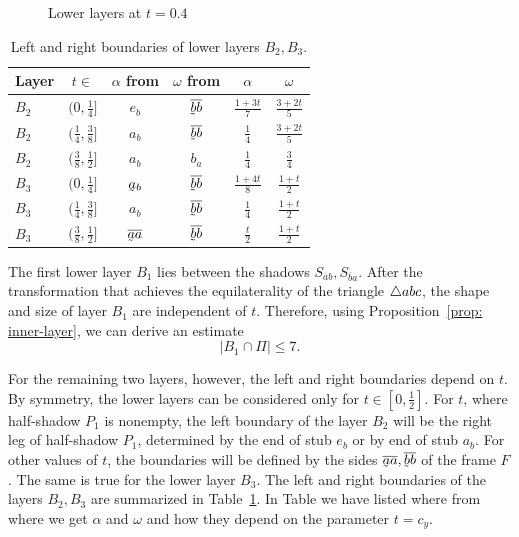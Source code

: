 \begin{figure}
\begin{center}

\end{center}
\caption{Lower layers at $t = 0.4$}
\label{fig: lower-layers}
\end{figure}

\begin{table}
\begin{center}
\begin{tabular}{lccccc}
	\toprule[1.5pt]
    Layer & $t \in $ & $\alpha$ from & $\omega$ from & $\alpha$ & $\omega$ \\
	\midrule[1.5pt]
	$B_{2}$ & $(0, \frac{1}{4}]$           & $e_{b}$ & $\overline{\undersym{b}b}$ & $\frac{1+3t}{7}$ & $\frac{3+2t}{5}$ \\[0.2cm]
	$B_{2}$ & $(\frac{1}{4}, \frac{3}{8}]$ & $a_{b}$ & $\overline{\undersym{b}b}$ & $\frac{1}{4}$ & $\frac{3+2t}{5}$ \\[0.2cm]
	$B_{2}$ & $(\frac{3}{8}, \frac{1}{2}]$ & $a_{b}$ & $b_{a}$ 				     & $\frac{1}{4}$ & $\frac{3}{4}$ \\[0.2cm]

	$B_{3}$ & $(0, \frac{1}{4}]$           & $\undersym{a}_{b}$         & $\overline{\undersym{b}b}$ & $\frac{1+4t}{8}$ & $\frac{1+t}{2}$ \\[0.2cm]
	$B_{3}$ & $(\frac{1}{4}, \frac{3}{8}]$ & $a_{b}$                    & $\overline{\undersym{b}b}$ & $\frac{1}{4}$ & $\frac{1+t}{2}$ \\[0.2cm]
	$B_{3}$ & $(\frac{3}{8}, \frac{1}{2}]$ & $\overline{\undersym{a}a}$ & $\overline{\undersym{b}b}$ & $\frac{t}{2}$ & $\frac{1+t}{2}$ \\[0.2cm]
	\bottomrule[1.5pt]
\end{tabular}
\end{center}
\caption{Left and right boundaries of lower layers $B_{2}, B_{3}$.}
\label{tab: left-and-right-borders-of-lower-layers}
\end{table}

The first lower layer $B_{1}$ lies between the shadows $S_{\overline{a}b}, S_{\overline{b}a}$. After the transformation that achieves the equilaterality of the triangle $\triangle{abc}$, the shape and size of layer $B_{1}$ are independent of $t$. Therefore, using Proposition~\ref{prop: inner-layer}, we can derive an estimate
$$
\left|
B_{1} \cap \Pi
\right| \leq 7.
$$

For the remaining two layers, however, the left and right boundaries depend on $t$. By symmetry, the lower layers can be considered only for $t \in [0,\frac{1}{2}]$. For $t$, where half-shadow $P_{1}$ is nonempty, the left boundary of the layer $B_{2}$ will be the right leg of half-shadow $P_{1}$, determined by the end of stub $e_{b}$ or by end of stub $a_{b}$. For other values of $t$, the boundaries will be defined by the sides $\overline{\undersym{a}a}, \overline{\undersym{b}b}$ of the frame $F$. The same is true for the lower layer $B_{3}$. The left and right boundaries of the layers $B_{2}, B_{3}$ are summarized in Table~\ref{tab: left-and-right-borders-of-lower-layers}. In Table we have listed where from where we get $\alpha$ and $\omega$ and how they depend on the parameter $t = c_{y}$.

